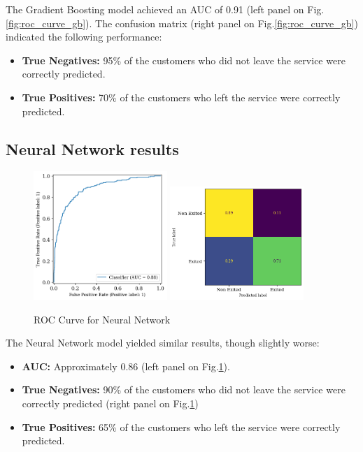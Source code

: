 \documentclass[12pt]{article}
\begin{document}
The Gradient Boosting model achieved an AUC of 0.91 (left panel on Fig.\ref{fig:roc_curve_gb}). The confusion matrix (right panel on Fig.\ref{fig:roc_curve_gb}) indicated the following performance:
\begin{itemize}
    \item \textbf{True Negatives:} 95\% of the customers who did not leave the service were correctly predicted.
    \item \textbf{True Positives:} 70\% of the customers who left the service were correctly predicted.
\end{itemize}

\subsection{Neural Network results}

\begin{figure}[h!]
    \centering
    \includegraphics[width=0.45\textwidth]{figures/roc_curve_nn.png}
    \includegraphics[width=0.45\textwidth]{figures/confusion_matrix_nn.png}
    \caption{ROC Curve for Neural Network}
    \label{fig:roc_curve_nn}
\end{figure}

The Neural Network model yielded similar results, though slightly worse:
\begin{itemize}
    \item \textbf{AUC:} Approximately 0.86 (left panel on Fig.\ref{fig:roc_curve_nn}).
    \item \textbf{True Negatives:} 90\% of the customers who did not leave the service were correctly predicted (right panel on Fig.\ref{fig:roc_curve_nn})
    \item \textbf{True Positives:} 65\% of the customers who left the service were correctly predicted.
\end{itemize}
\end{document}

